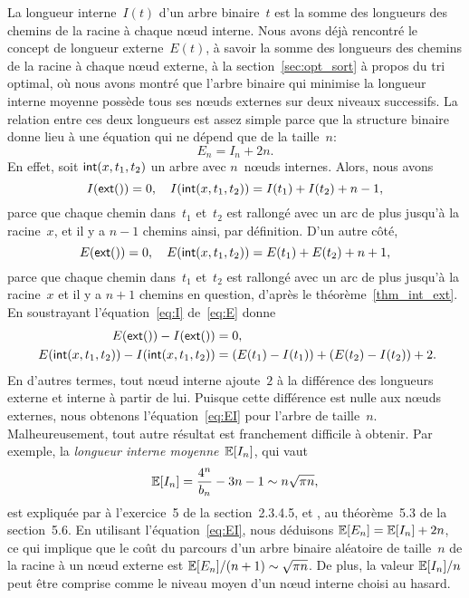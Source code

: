 La longueur interne~\(I(t)\)
d'un arbre binaire~\(t\) est la somme des longueurs des chemins de la
racine à chaque nœud interne. Nous avons déjà rencontré le concept
de longueur externe~\(E(t)\), à
savoir la somme des longueurs des chemins de la racine à chaque
nœud externe, à la section~\vref{sec:opt_sort} à propos du tri
optimal, où nous avons montré que l'arbre binaire qui minimise la
longueur interne moyenne possède tous ses nœuds externes sur deux
niveaux successifs. La relation entre ces deux longueurs est assez
simple parce que la structure binaire donne lieu à une équation qui ne
dépend que de la taille~\(n\):
\begin{equation}
E_n = I_n + 2n.\label{eq:EI}
\end{equation}
En effet, soit \(\textsf{int}(x,t_1,t_2)\) un arbre avec \(n\)~nœuds
internes. Alors, nous avons
\begin{equation}
  I(\textsf{ext}()) = 0,\quad
  I(\textsf{int}(x,t_1,t_2)) = I(t_1) + I(t_2) + n - 1,
\label{eq:I}
\end{equation}
parce que chaque chemin dans~\(t_1\) et~\(t_2\) est rallongé avec un
arc de plus jusqu'à la racine~\(x\), et il y a \(n-1\) chemins ainsi,
par définition. D'un autre côté,
\begin{equation}
  E(\textsf{ext}()) = 0,\quad
  E(\textsf{int}(x,t_1,t_2)) = E(t_1) + E(t_2) + n + 1,
\label{eq:E}
\end{equation}
parce que chaque chemin dans~\(t_1\) et~\(t_2\) est rallongé avec un
arc de plus jusqu'à la racine~\(x\) et il y a \(n+1\) chemins en
question, d'après le théorème~\vref{thm_int_ext}. En soustrayant
l'équation~\eqref{eq:I} de~\eqref{eq:E} donne
\begin{align*}
  E(\textsf{ext}()) - I(\textsf{ext}()) &= 0,\\
  E(\textsf{int}(x,t_1,t_2)) - I(\textsf{int}(x,t_1,t_2))
  &= (E(t_1) - I(t_1)) + (E(t_2) - I(t_2)) + 2.\!\!
\end{align*}
En d'autres termes, tout nœud interne ajoute~\(2\) à la différence
des longueurs externe et interne à partir de lui. Puisque cette
différence est nulle aux nœuds externes, nous obtenons
l'équation~\eqref{eq:EI} pour l'arbre de taille~\(n\). Malheureusement,
tout autre résultat est franchement difficile à obtenir. Par exemple,
la \emph{longueur interne moyenne}~\(\mathbb{E}[{I_n}]\), qui vaut
\begin{equation*}
\mathbb{E}[{I_n}]  = \frac{4^n}{b_n} - 3n - 1 \sim n \sqrt{\pi n},
\end{equation*}
est expliquée par \cite{Knuth_1997} à l'exercice~5 de la
section~2.3.4.5, et \cite{SedgewickFlajolet_1996}, au théorème~5.3 de
la section~5.6.  En utilisant l'équation~\eqref{eq:EI}, nous déduisons
\(\mathbb{E}[{E_n}] = \mathbb{E}[{I_n}] + 2n\), ce qui implique que le coût
du parcours d'un arbre binaire aléatoire de taille~\(n\) de la racine
à un nœud externe est \(\mathbb{E}[{E_n}]/(n+1) \sim \sqrt{\pi
  n}\). De plus, la valeur \(\mathbb{E}[{I_n}]/n\) peut être comprise
comme le niveau moyen d'un nœud interne choisi au hasard.

